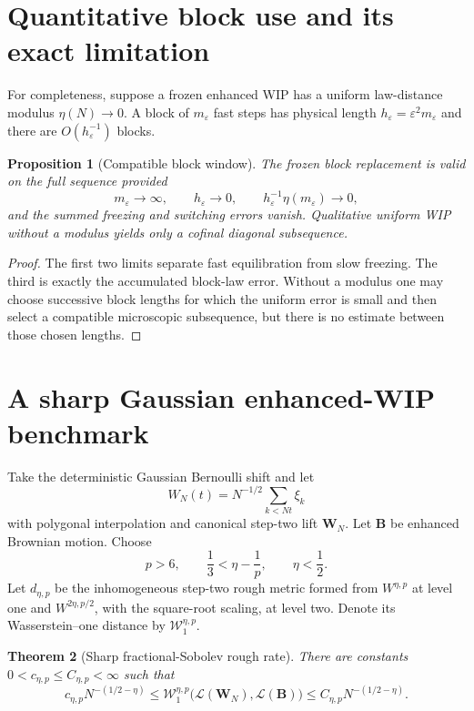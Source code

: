 \documentclass[11pt,reqno]{amsart}
\newtheorem{theorem}{Theorem}[section]
\newtheorem{proposition}[theorem]{Proposition}
\theoremstyle{definition}
\theoremstyle{remark}
\begin{document}
\section{Quantitative block use and its exact limitation}\label{sec:block}

For completeness, suppose a frozen enhanced WIP has a uniform law-distance
modulus $\eta(N)\to0$.  A block of $m_\varepsilon$ fast steps has physical
length $h_\varepsilon=\varepsilon^2m_\varepsilon$ and there are
$O(h_\varepsilon^{-1})$ blocks.

\begin{proposition}[Compatible block window]\label{prop:block}
The frozen block replacement is valid on the full sequence provided
\[
 m_\varepsilon\to\infty,
 \qquad h_\varepsilon\to0,
 \qquad h_\varepsilon^{-1}\eta(m_\varepsilon)\to0,
\]
and the summed freezing and switching errors vanish.  Qualitative uniform WIP
without a modulus yields only a cofinal diagonal subsequence.
\end{proposition}

\begin{proof}
The first two limits separate fast equilibration from slow freezing.  The third
is exactly the accumulated block-law error.  Without a modulus one may choose
successive block lengths for which the uniform error is small and then select
a compatible microscopic subsequence, but there is no estimate between those
chosen lengths.
\end{proof}

\section{A sharp Gaussian enhanced-WIP benchmark}\label{sec:rate}

Take the deterministic Gaussian Bernoulli shift and let
\[
 W_N(t)=N^{-1/2}\sum_{k<Nt}\xi_k
\]
with polygonal interpolation and canonical step-two lift $\mathbf W_N$.
Let $\mathbf B$ be enhanced Brownian motion.  Choose
\begin{equation}\label{eq:window}
 p>6,
 \qquad \frac13<\eta-\frac1p,
 \qquad \eta<\frac12.
\end{equation}
Let $d_{\eta,p}$ be the inhomogeneous step-two rough metric formed from
$W^{\eta,p}$ at level one and $W^{2\eta,p/2}$, with the square-root scaling, at
level two.  Denote its Wasserstein--one distance by $\mathcal W_1^{\eta,p}$.

\begin{theorem}[Sharp fractional-Sobolev rough rate]\label{thm:rate}
There are constants $0<c_{\eta,p}\le C_{\eta,p}<\infty$ such that
\begin{equation}\label{eq:rate}
 c_{\eta,p}N^{-(1/2-\eta)}
 \le
 \mathcal W_1^{\eta,p}
 \bigl(\mathcal L(\mathbf W_N),\mathcal L(\mathbf B)\bigr)
 \le
 C_{\eta,p}N^{-(1/2-\eta)}.
\end{equation}
\end{theorem}
\end{document}
